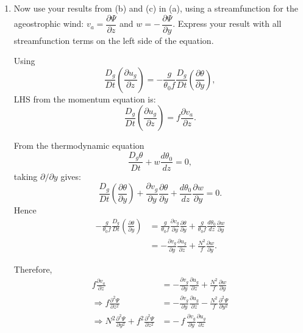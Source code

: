 \documentclass[11pt,a4paper]{article}
\begin{document}
{\begin{enumerate}[label=(\alph*)]
\begin{solution}
    The meridional gradient of vertical velocity acts on the stably stratified basic state to produce differential adiabatic warming/cooling, which changes the horizontal temperature gradient. Through thermal wind balance, this temperature-gradient tendency forces the vertical shear of $u_g$ to evolve. 
    \end{solution}
    
    \item Now use your results from (b) and (c) in (a), using a streamfunction for the ageostrophic wind: $v_a = \dfrac{\partial\Psi}{\partial z}$ and $w = -\,\dfrac{\partial\Psi}{\partial y}$. Express your result with all streamfunction terms on the left side of the equation.
\begin{solution}
Using
\[
\frac{D_g}{Dt} \left(\frac{\partial u_g}{\partial z}\right)
=
-\frac{g}{\theta_0 f}\frac{D_g}{Dt} \left(\frac{\partial \theta}{\partial y}\right),
\]
LHS from the momentum equation is: 
$$\frac{D_g}{Dt} \left(\frac{\partial u_g}{\partial z}\right) = f\frac{\partial v_a}{\partial z}.$$

From the thermodynamic equation
\[
\frac{D_g\theta}{Dt}+w\frac{d\theta_0}{dz}=0,
\]
taking $\partial/\partial y$ gives:
\[
\frac{D_g}{Dt} \left(\frac{\partial \theta}{\partial y}\right)
+\frac{\partial v_g}{\partial y}\frac{\partial \theta}{\partial y}
+\frac{d\theta_0}{dz}\frac{\partial w}{\partial y}=0.
\]
Hence
\begin{align*}
-\frac{g}{\theta_0 f}\frac{D_g}{Dt} \left(\frac{\partial \theta}{\partial y}\right)
&=
\frac{g}{\theta_0 f}\frac{\partial v_g}{\partial y}\frac{\partial \theta}{\partial y}
+\frac{g}{\theta_0 f}\frac{d\theta_0}{dz}\frac{\partial w}{\partial y}\\
&= -\frac{\partial v_g}{\partial y}\frac{\partial u_g}{\partial z}
+\frac{N^2}{f}\frac{\partial w}{\partial y}.
\end{align*}

Therefore,
\begin{align*}
    f\frac{\partial v_a}{\partial z}
&=
-\frac{\partial v_g}{\partial y}\frac{\partial u_g}{\partial z}
+\frac{N^2}{f}\frac{\partial w}{\partial y}\\
\Rightarrow
f\frac{\partial^2\Psi}{\partial z^2}
&=
-\frac{\partial v_g}{\partial y}\frac{\partial u_g}{\partial z}
-\frac{N^2}{f}\frac{\partial^2\Psi}{\partial y^2}\\
\Rightarrow N^2\frac{\partial^2\Psi}{\partial y^2}
+
f^2\frac{\partial^2\Psi}{\partial z^2}
&=
-\,f\,
\frac{\partial v_g}{\partial y}
\frac{\partial u_g}{\partial z}
\end{align*}
\end{solution}



\end{enumerate}}
\end{document}
